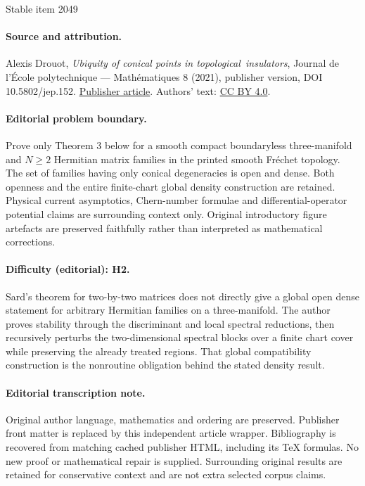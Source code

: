\documentclass[11pt]{article}
\numberwithin{equation}{section}
\theoremstyle{definition}
\begin{document}
\begin{center}{\Large Stable item 2049}\end{center}
\paragraph{Source and attribution.}
Alexis Drouot, \emph{Ubiquity of conical points in topological insulators}, Journal de l’École polytechnique — Mathématiques 8 (2021), publisher version, DOI 10.5802/jep.152. \href{https://jep.centre-mersenne.org/articles/10.5802/jep.152/}{Publisher article}. Authors' text: \href{https://creativecommons.org/licenses/by/4.0/}{CC BY 4.0}.
\paragraph{Editorial problem boundary.}
Prove only Theorem 3 below for a smooth compact boundaryless three-manifold and \(N\ge2\) Hermitian matrix families in the printed smooth Fréchet topology. The set of families having only conical degeneracies is open and dense. Both openness and the entire finite-chart global density construction are retained. Physical current asymptotics, Chern-number formulae and differential-operator potential claims are surrounding context only. Original introductory figure artefacts are preserved faithfully rather than interpreted as mathematical corrections.
\paragraph{Difficulty (editorial): H2.}
Sard's theorem for two-by-two matrices does not directly give a global open dense statement for arbitrary Hermitian families on a three-manifold. The author proves stability through the discriminant and local spectral reductions, then recursively perturbs the two-dimensional spectral blocks over a finite chart cover while preserving the already treated regions. That global compatibility construction is the nonroutine obligation behind the stated density result.
\paragraph{Editorial transcription note.}
Original author language, mathematics and ordering are preserved. Publisher front matter is replaced by this independent article wrapper. Bibliography is recovered from matching cached publisher HTML, including its TeX formulas. No new proof or mathematical repair is supplied. Surrounding original results are retained for conservative context and are not extra selected corpus claims.
\clearpage
\end{document}
